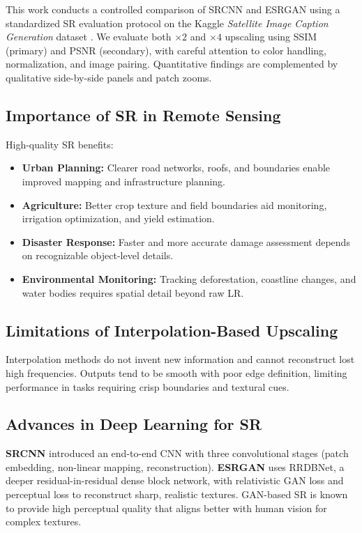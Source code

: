 \documentclass[]{spie}
\begin{document}
This work conducts a controlled comparison of SRCNN and ESRGAN using a standardized SR evaluation protocol on the Kaggle \textit{Satellite Image Caption Generation} dataset \cite{kaggle_dataset}. We evaluate both $\times2$ and $\times4$ upscaling using SSIM (primary) and PSNR (secondary), with careful attention to color handling, normalization, and image pairing. Quantitative findings are complemented by qualitative side-by-side panels and patch zooms.

\subsection{Importance of SR in Remote Sensing}
High-quality SR benefits:
\begin{itemize}
    \item \textbf{Urban Planning:} Clearer road networks, roofs, and boundaries enable improved mapping and infrastructure planning.
    \item \textbf{Agriculture:} Better crop texture and field boundaries aid monitoring, irrigation optimization, and yield estimation.
    \item \textbf{Disaster Response:} Faster and more accurate damage assessment depends on recognizable object-level details.
    \item \textbf{Environmental Monitoring:} Tracking deforestation, coastline changes, and water bodies requires spatial detail beyond raw LR.
\end{itemize}

\subsection{Limitations of Interpolation-Based Upscaling}
Interpolation methods do not invent new information and cannot reconstruct lost high frequencies. Outputs tend to be smooth with poor edge definition, limiting performance in tasks requiring crisp boundaries and textural cues.

\subsection{Advances in Deep Learning for SR}
\textbf{SRCNN} \cite{dong2014learning} introduced an end-to-end CNN with three convolutional stages (patch embedding, non-linear mapping, reconstruction).  
\textbf{ESRGAN} \cite{wang2018esrgan} uses RRDBNet, a deeper residual-in-residual dense block network, with relativistic GAN loss and perceptual loss to reconstruct sharp, realistic textures. GAN-based SR is known to provide high perceptual quality that aligns better with human vision for complex textures.
\end{document}
